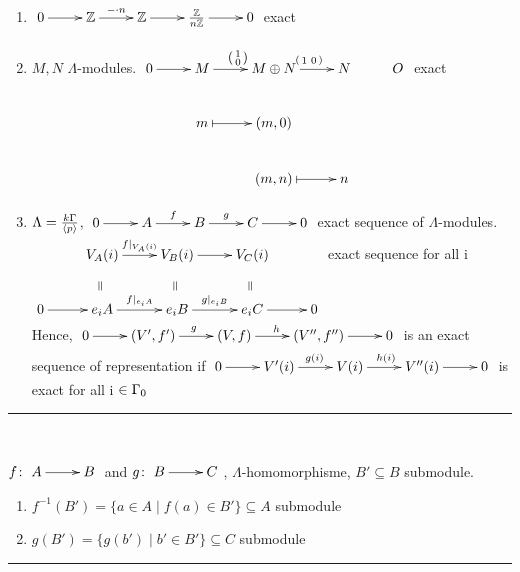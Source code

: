 \begin{exam}
	\begin{enumerate}[(1)]
		\item  $\xymatrix{0 \ar[r] & \mathbb{Z}\ar[r]^{-\cdot n} & \mathbb{Z}\ar[r] & \frac{\mathbb{Z}}{n\mathbb{Z}} \ar[r] & 0}$ exact
		\item $M, N$ $\Lambda$-modules.
		$\xymatrix
		{
			0\ar[r] & M\ar[r]^{\left(\begin{smallmatrix} 1 \\ 0 \end{smallmatrix}\right)} & M\oplus N\ar[r]^{\left(\begin{smallmatrix} 1 & 0 \end{smallmatrix}\right)} & N & O \\
			  & m \ar@{|->}[r]& (m,0) \\
			  &   & (m,n) \ar@{|->}[r]    & n\\
		}$ exact
	\item $\Lambda = \frac{k\Gamma}{\langle p \rangle}$, $\xymatrix{0 \ar[r] & A\ar[r]^f & B\ar[r]^g & C \ar[r] & 0}$ exact sequence of $\Lambda$-modules.
	$\xymatrix
	{
		 & V_A(i)\ar@{}[d]|-*[@]{=} \ar[r]^{f\vert_{V_A(i)}} & V_B(i)\ar@{}[d]|-*[@]{=} \ar[r]& V_C(i)\ar@{}[d]|-*[@]{=} & \\
		0\ar[r]& e_iA \ar[r]^{f\vert_{e_iA}}  & e_iB  \ar[r]^{g\vert_{e_iB}}  & e_iC \ar[r]  & 0\\
	}$ exact sequence for all i\\
Hence, 	$\xymatrix{0 \ar[r] & (V',f')\ar[r]^g & (V,f)\ar[r]^h & (V'',f'') \ar[r] & 0}$ is an exact sequence of representation if $\xymatrix{0 \ar[r] & V'(i)\ar[r]^{g(i)} & V(i)\ar[r]^{h(i)} & V''(i) \ar[r] & 0}$ is exact for all i $\in\Gamma_0$
	
	\end{enumerate}
\end{exam}
\rule{\textwidth}{1pt}\\
\begin{exer}
		$f\colon\xymatrix{A\ar[r] & B}$ and $g\colon\xymatrix{B\ar[r] & C}$, $\Lambda$-homomorphisme, $B' \subseteq B$ submodule.
		\begin{enumerate}[(1)]
			\item $f^{-1}(B')= \{ a\in A\mid f(a)\in B'\}\subseteq A$ submodule
			\item $g(B')= \{ g(b')\mid b'\in B'\}\subseteq C$ submodule
		\end{enumerate}
\end{exer}
\rule{\textwidth}{1pt}\\
